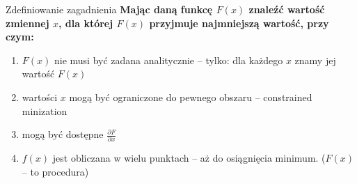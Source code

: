   \begin{frame}
    \begin{block}{Zdefiniowanie zagadnienia}
      \textbf{Mając daną funkcę $ F(x) $ znaleźć wartość
      zmiennej $ x $, dla której $ F(x) $ przyjmuje
      najmniejszą wartość, przy czym:}
      \begin{enumerate}
        \item $ F(x) $ nie musi być zadana analitycznie --
        tylko: dla każdego $ x $ znamy jej wartość $ F(x) $
        \item wartości $ x $ mogą być ograniczone do pewnego
        obszaru -- constrained minization
        \item mogą być dostępne $ \frac{\partial F}{\partial x} $
        \item $ f(x) $ jest obliczana w wielu punktach --
        aż do osiągnięcia minimum. ($ F(x) $ -- to procedura)
      \end{enumerate}
    \end{block}

  \end{frame}
